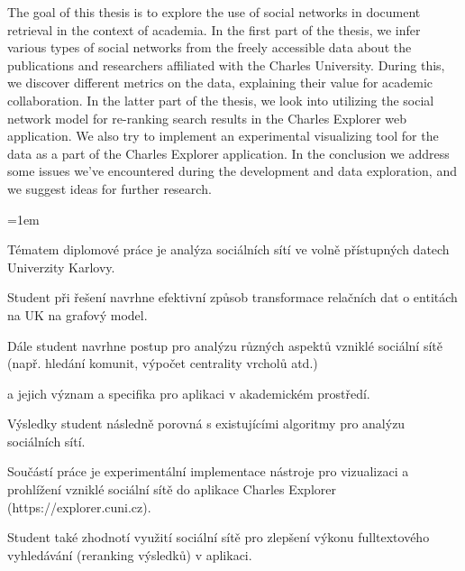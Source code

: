 \documentclass[12pt]{report}
\begin{document}

The goal of this thesis is to explore the use of social networks in document retrieval in the context of academia. 
In the first part of the thesis, we infer various types of social networks from the freely accessible data about the publications and researchers affiliated with the Charles University. During this, we discover different metrics on the data, explaining their value for academic collaboration.
In the latter part of the thesis, we look into utilizing the social network model for re-ranking search results in the Charles Explorer web application. We also try to implement an experimental visualizing tool for the data as a part of the Charles Explorer application.
In the conclusion we address some issues we've encountered during the development and data exploration, and we suggest ideas for further research.

\parskip=1em


Tématem diplomové práce je analýza sociálních sítí ve volně přístupných datech Univerzity Karlovy. 

\checkmark \; \; Student při řešení navrhne efektivní způsob transformace relačních dat o entitách na UK na grafový model. 

Dále student navrhne postup pro analýzu různých aspektů vzniklé sociální sítě (např. hledání komunit, výpočet centrality vrcholů atd.) 

a jejich význam a specifika pro aplikaci v akademickém prostředí. 

Výsledky student následně porovná s existujícími algoritmy pro analýzu sociálních sítí. 

\checkmark \; \; Součástí práce je experimentální implementace nástroje pro vizualizaci a prohlížení vzniklé sociální sítě do aplikace Charles Explorer (https://explorer.cuni.cz). 

Student také zhodnotí využití sociální sítě pro zlepšení výkonu fulltextového vyhledávání (reranking výsledků) v aplikaci.
\end{document}

